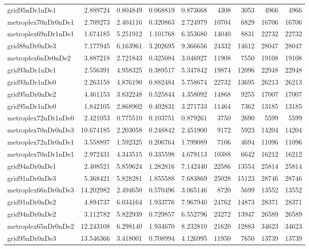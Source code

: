 \begin{longtable}{|l|r|r|r|r|r|r|r|r|}
grid95nDr1nDe1 & 2.889724 & 0.804849 & 0.068819 & 0.873668 & 4308 & 3053 & 4966 & 4966 \\
metroplex70nDr0nDe1 & 2.709273 & 2.404116 & 0.320863 & 2.724979 & 10704 & 6829 & 16706 & 16706 \\
metroplex69nDr1nDe1 & 1.674185 & 5.251912 & 1.101768 & 6.353680 & 14040 & 8831 & 22732 & 22732 \\
grid88nDr0nDe3 & 7.177945 & 6.163961 & 3.202695 & 9.366656 & 24332 & 14612 & 28047 & 28047 \\
metroplex6nDr0nDe2 & 3.887218 & 2.721843 & 0.325084 & 3.046927 & 11908 & 7550 & 19108 & 19108 \\
grid93nDr1nDe1 & 2.556391 & 4.958325 & 0.389517 & 5.347842 & 19874 & 12096 & 22948 & 22948 \\
grid93nDr1nDe0 & 2.263158 & 4.876190 & 0.882484 & 5.758674 & 22732 & 13695 & 26213 & 26213 \\
grid95nDr0nDe2 & 4.461153 & 3.832248 & 0.525844 & 4.358092 & 14868 & 9255 & 17007 & 17007 \\
grid95nDr1nDe0 & 1.842105 & 2.868902 & 0.402831 & 3.271733 & 11464 & 7362 & 13185 & 13185 \\
metroplex72nDr1nDe0 & 2.421053 & 0.775510 & 0.103751 & 0.879261 & 3750 & 2690 & 5599 & 5599 \\
metroplex70nDr0nDe3 & 10.674185 & 2.203058 & 0.248842 & 2.451900 & 9172 & 5923 & 14204 & 14204 \\
metroplex72nDr0nDe1 & 3.558897 & 1.592325 & 0.206764 & 1.799089 & 7106 & 4694 & 11096 & 11096 \\
metroplex70nDr1nDe1 & 2.972431 & 4.343515 & 0.335598 & 4.679113 & 10388 & 6642 & 16212 & 16212 \\
grid94nDr0nDe1 & 2.408521 & 5.859624 & 1.282816 & 7.142440 & 22586 & 13554 & 25814 & 25814 \\
grid91nDr0nDe3 & 5.368421 & 5.828281 & 1.855588 & 7.683869 & 25028 & 15123 & 28746 & 28746 \\
metroplex66nDr0nDe3 & 14.202982 & 2.494650 & 0.570496 & 3.065146 & 8720 & 5699 & 13552 & 13552 \\
grid91nDr0nDe2 & 4.894737 & 6.034164 & 1.933776 & 7.967940 & 24762 & 14873 & 28371 & 28371 \\
grid94nDr0nDe2 & 3.112782 & 5.822939 & 0.729857 & 6.552796 & 23272 & 13947 & 26589 & 26589 \\
metroplex65nDr0nDe2 & 12.243108 & 6.298140 & 1.934670 & 8.232810 & 21620 & 12883 & 34623 & 34623 \\
grid95nDr0nDe3 & 13.546366 & 3.418001 & 0.708994 & 4.126995 & 11950 & 7650 & 13739 & 13739 \\

\end{longtable}
